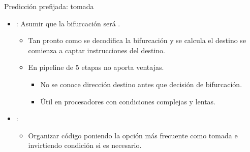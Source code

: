 \begin{frame}[t]{Predicción prefijada: tomada}
\begin{itemize}
  \item {}: Asumir que la bifurcación será .
    \begin{itemize}
      \item Tan pronto como se decodifica la bifurcación y se calcula el destino se comienza a captar instrucciones del destino.
      \item En pipeline de 5 etapas no aporta ventajas.
        \begin{itemize}
          \item No se conoce dirección destino antes que decisión de bifurcación.
          \item Útil en procesadores con condiciones complejas y lentas.
        \end{itemize}
    \end{itemize}

  \item {}:
    \begin{itemize}
      \item Organizar código poniendo la opción más frecuente como tomada e invirtiendo condición si es necesario.
    \end{itemize}
\end{itemize}
\end{frame}

